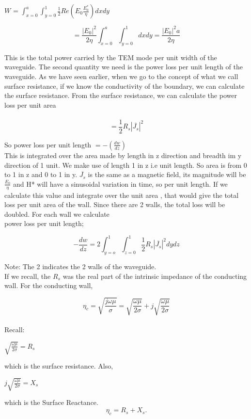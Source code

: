 \begin{center}
	$W$ = $\int_{x=0}^{a}\int_{y=0}^{1}\frac{1}{2}Re(E_0 \frac{E_0^*}{\eta})dxdy$
	
\end{center}
\begin{equation}
= \frac{\left|E_{0}\right|^2}{2\eta}\int_{x=0}^{a}\int_{y=0}^{1}dxdy = \frac{|E_0|^2a}{2\eta}
\end{equation}


This is the total power carried by the TEM mode per unit width of the waveguide. The second quantity we need is the power loss per unit length of the waveguide. As we have seen earlier, when we go to the concept of what we call surface resistance, if we know the conductivity of the boundary, we can calculate the surface resistance. From the surface resistance, we can calculate the power loss per unit area\\\\
\begin{equation}
=\frac{1}{2}R_s|\overline{J_s}|^2 
\end{equation}

So power loss per unit length 
$ =-(\frac{dw}{dz}) $\\

This is integrated over the area made by length in z direction and breadth im y direction of 1  unit. We make use of length 1 in z i.e unit length. So area is from 0 to 1 in z and 0 to 1 in y. $ \overline{J_s} $ is the same as a magnetic field, its magnitude will be $ \frac{E_0}{\eta} $ and H* will have a sinusoidal variation in time, so per unit length. If we calculate this value and integrate over the unit area 
, that would give the total loss per unit area of the wall. Since there are 2 walls, the total loss will be doubled. For each wall we calculate\\
power loss per unit length; 

\begin{equation}
-\frac{dw}{dz}= 2 \int_{y=o}^{1} \int_{z=0}^{1}\frac{1}{2}R_s|\overline{J_s}|^2dydz
\end{equation}


Note: The 2 indicates the 2 walls of the waveguide. \\
If we recall, the $R_s$ was the real part of the intrinsic impedance of the conducting wall. For the conducting wall,


$$\eta_c = \sqrt{\frac{j\omega\mu}{\sigma}}= \sqrt{\frac{\omega\mu}{2\sigma}}+j\sqrt{\frac{\omega\mu}{2\sigma}}$$\\
Recall:
\begin{center}
	$\sqrt{\frac{\omega\mu}{2\sigma}}=R_s$	
\end{center}
which is the surface resistance. Also,\\
\begin{center}
	$j\sqrt{\frac{\omega\mu}{2\sigma}}=X_s$
\end{center}
which is the Surface Reactance.
\begin{equation}
\eta_c = R_s + X_s.
\end{equation}


